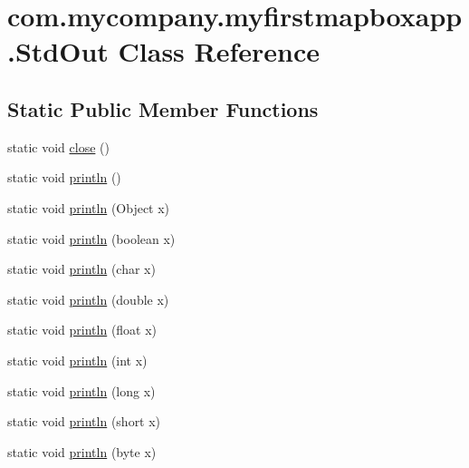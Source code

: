 \hypertarget{classcom_1_1mycompany_1_1myfirstmapboxapp_1_1_std_out}{}\section{com.\+mycompany.\+myfirstmapboxapp.\+Std\+Out Class Reference}
\label{classcom_1_1mycompany_1_1myfirstmapboxapp_1_1_std_out}
\subsection*{Static Public Member Functions}
\begin{DoxyCompactItemize}
\item 
static void \hyperlink{classcom_1_1mycompany_1_1myfirstmapboxapp_1_1_std_out_aef708ae79dc66deef01b3d67d3d3bc0f}{close} ()
\item 
static void \hyperlink{classcom_1_1mycompany_1_1myfirstmapboxapp_1_1_std_out_ace368f8402b27f92958c68b2c4524a45}{println} ()
\item 
static void \hyperlink{classcom_1_1mycompany_1_1myfirstmapboxapp_1_1_std_out_a73b71d3705a8c2b72faa655dc4abb612}{println} (Object x)
\item 
static void \hyperlink{classcom_1_1mycompany_1_1myfirstmapboxapp_1_1_std_out_a62dbfdc38ed277595c67c7c5c5b37f41}{println} (boolean x)
\item 
static void \hyperlink{classcom_1_1mycompany_1_1myfirstmapboxapp_1_1_std_out_ad316f91494b4f1d9be26ce888769f625}{println} (char x)
\item 
static void \hyperlink{classcom_1_1mycompany_1_1myfirstmapboxapp_1_1_std_out_a0e8bcedeb6a8692f02da9cb5b5a8ecbe}{println} (double x)
\item 
static void \hyperlink{classcom_1_1mycompany_1_1myfirstmapboxapp_1_1_std_out_ab40370ac41682e06fba46002853bc740}{println} (float x)
\item 
static void \hyperlink{classcom_1_1mycompany_1_1myfirstmapboxapp_1_1_std_out_a031ff542677ff87baada59e2ee1f6b10}{println} (int x)
\item 
static void \hyperlink{classcom_1_1mycompany_1_1myfirstmapboxapp_1_1_std_out_ac2bdc259e2b370205da550732de9e6e8}{println} (long x)
\item 
static void \hyperlink{classcom_1_1mycompany_1_1myfirstmapboxapp_1_1_std_out_a31bca259a3917b9778fb3a130694f9ed}{println} (short x)
\item 
static void \hyperlink{classcom_1_1mycompany_1_1myfirstmapboxapp_1_1_std_out_a43af795c8e5a72fd5bc3c6efe20fc502}{println} (byte x)

\end{DoxyCompactItemize}
